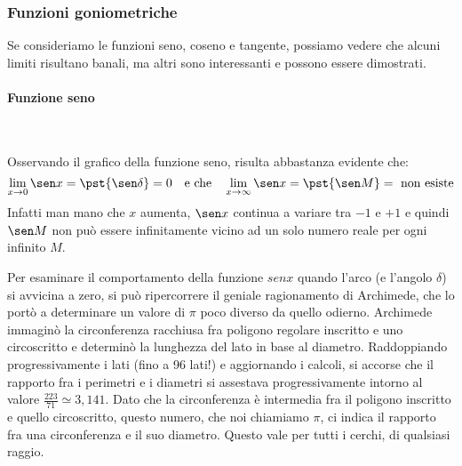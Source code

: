 \subsubsection{Funzioni goniometriche}

Se consideriamo le funzioni seno, coseno e tangente, possiamo vedere che 
alcuni limiti risultano banali, ma altri sono interessanti e possono essere 
dimostrati.

\begin{minipage}{.66\textwidth}
\begin{center} \sinusoide \end{center}
\begin{center} \cosinusoide \end{center}
\end{minipage}
\hfill
\begin{minipage}{.33\textwidth}
\begin{center} \tangentoide \end{center}
\end{minipage}

\paragraph{Funzione seno}~
\label{limiti:par_f_seno}

Osservando il grafico della funzione seno, risulta abbastanza evidente che:
\[\lim_{x \rightarrow 0}{\sen x} = \pst{\sen \delta} = 0
\quad \text{e che} \quad 
\lim_{x \rightarrow \infty}{\sen x} = \pst{\sen M} = \text{ non esiste}\]
Infatti man mano che \(x\) aumenta, \(\sen x\)
continua a variare tra \(-1\) e \(+1\) e quindi 
\(\sen M\) non può essere infinitamente vicino ad un solo numero reale
per ogni infinito \(M\).

Per esaminare il comportamento della funzione \(sen x\) quando l'arco (e 
l'angolo \(\delta\)) si avvicina a zero, si può ripercorrere il geniale 
ragionamento di Archimede, che lo portò a determinare un valore di \(\pi\) 
poco diverso da quello odierno. Archimede immaginò la circonferenza racchiusa 
fra poligono regolare inscritto e uno circoscritto e determinò la lunghezza del 
lato in base al diametro. Raddoppiando progressivamente i lati (fino a 96 
lati!) e aggiornando i calcoli, si accorse che il rapporto fra i perimetri e i 
diametri si assestava progressivamente intorno al valore 
\(\frac{223}{71}\simeq 3,141\). Dato che la circonferenza è intermedia fra il 
poligono inscritto e quello circoscritto, questo numero, che noi chiamiamo 
\(\pi\), ci indica il rapporto fra una circonferenza e il 
suo diametro. Questo vale per tutti i cerchi, di qualsiasi raggio.\\

